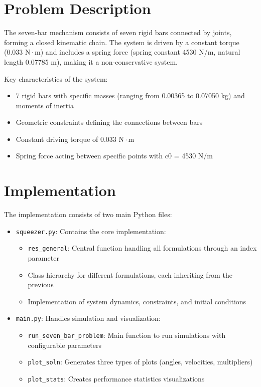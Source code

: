 \documentclass{article}
\begin{document}
\section*{Problem Description}
\indent

The seven-bar mechanism consists of seven rigid bars connected by joints, forming a closed kinematic chain. The system is driven by a constant torque (0.033 $\mathrm{N}\cdot\mathrm{m}$) and includes a spring force (spring constant 4530 N/m, natural length 0.07785 m), making it a non-conservative system.

Key characteristics of the system:
\begin{itemize}
    \item 7 rigid bars with specific masses (ranging from 0.00365 to 0.07050 kg) and moments of inertia
    \item Geometric constraints defining the connections between bars
    \item Constant driving torque of 0.033 $\mathrm{N}\cdot\mathrm{m}$
    \item Spring force acting between specific points with c0 = 4530 N/m
\end{itemize}

\section*{Implementation}
\indent

The implementation consists of two main Python files:

\begin{itemize}
    \item \texttt{squeezer.py}: Contains the core implementation:
    \begin{itemize}
        \item \texttt{res\_general}: Central function handling all formulations through an index parameter
        \item Class hierarchy for different formulations, each inheriting from the previous
        \item Implementation of system dynamics, constraints, and initial conditions
    \end{itemize}
    
    \item \texttt{main.py}: Handles simulation and visualization:
    \begin{itemize}
        \item \texttt{run\_seven\_bar\_problem}: Main function to run simulations with configurable parameters
        \item \texttt{plot\_soln}: Generates three types of plots (angles, velocities, multipliers)
        \item \texttt{plot\_stats}: Creates performance statistics visualizations
    \end{itemize}
\end{itemize}
\end{document}
